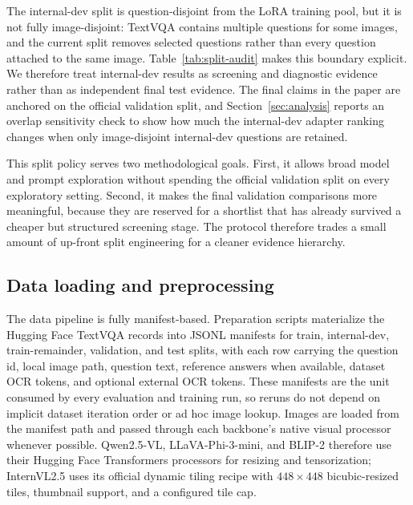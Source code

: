 The internal-dev split is question-disjoint from the LoRA training pool, but it is not fully image-disjoint: TextVQA contains multiple questions for some images, and the current split removes selected questions rather than every question attached to the same image. Table~\ref{tab:split-audit} makes this boundary explicit. We therefore treat internal-dev results as screening and diagnostic evidence rather than as independent final test evidence. The final claims in the paper are anchored on the official validation split, and Section~\ref{sec:analysis} reports an overlap sensitivity check to show how much the internal-dev adapter ranking changes when only image-disjoint internal-dev questions are retained.

\begin{table}[t]
    \centering
    \small
    
    \caption{Data-use audit for the current study. Internal-dev is useful for inexpensive screening and adapter diagnostics, but official validation is the final paper-facing evaluation split.}
    \label{tab:split-audit}
\end{table}

This split policy serves two methodological goals. First, it allows broad model and prompt exploration without spending the official validation split on every exploratory setting. Second, it makes the final validation comparisons more meaningful, because they are reserved for a shortlist that has already survived a cheaper but structured screening stage. The protocol therefore trades a small amount of up-front split engineering for a cleaner evidence hierarchy.

\subsection{Data loading and preprocessing}

The data pipeline is fully manifest-based. Preparation scripts materialize the Hugging Face TextVQA records \citep{lhoest2021datasets} into JSONL manifests for train, internal-dev, train-remainder, validation, and test splits, with each row carrying the question id, local image path, question text, reference answers when available, dataset OCR tokens, and optional external OCR tokens. These manifests are the unit consumed by every evaluation and training run, so reruns do not depend on implicit dataset iteration order or ad hoc image lookup. Images are loaded from the manifest path and passed through each backbone's native visual processor whenever possible. Qwen2.5-VL, LLaVA-Phi-3-mini, and BLIP-2 therefore use their Hugging Face Transformers processors \citep{wolf2020transformers} for resizing and tensorization; InternVL2.5 uses its official dynamic tiling recipe with $448{\times}448$ bicubic-resized tiles, thumbnail support, and a configured tile cap.

